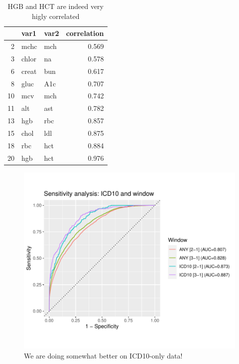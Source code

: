 \documentclass[12pt]{article}
\begin{document}
\begin{table}[ht]
\centering
\begin{tabular}{rllr}
  \hline
 & var1 & var2 & correlation \\ 
  \hline
  2 & mchc & mch & 0.569 \\ 
  3 & chlor & na & 0.578 \\ 
  6 & creat & bun & 0.617 \\ 
  8 & gluc & A1c & 0.707 \\ 
  10 & mcv & mch & 0.742 \\ 
  11 & alt & ast & 0.782 \\ 
  13 & hgb & rbc & 0.857 \\ 
  15 & chol & ldl & 0.875 \\ 
  18 & rbc & hct & 0.884 \\ 
  20 & hgb & hct & 0.976 \\ 
   \hline
\end{tabular}
\caption{HGB and HCT are indeed very higly correlated}
\end{table}


\clearpage


\begin{figure}[h]
\centering
\includegraphics[width=\textwidth]{figures/roc_icd10.pdf}
\caption{We are doing somewhat better on ICD10-only data!}
\end{figure}


\clearpage
\end{document}
